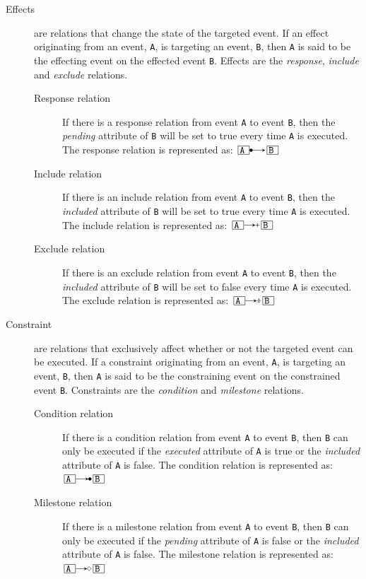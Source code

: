 \documentclass{article}
\begin{document}
			\begin{description}
				\item[Effects] are relations that change the state of the targeted event.
				If an effect originating from an event, \texttt{A}, is targeting an event, \texttt{B}, then \texttt{A} is said to be the effecting event on the effected event \texttt{B}.
				Effects are the \emph{response}, \emph{include} and \emph{exclude} relations.
				\begin{description}
					\item[Response relation] If there is a response relation from event \texttt{A} to event \texttt{B}, then the \textit{pending} attribute of \texttt{B} will be set to true every time \texttt{A} is executed.
				The response relation is represented as: $\ev{A} \rrel \ev{B}$
					\item[Include relation] If there is an include relation from event \texttt{A} to event \texttt{B}, then the \textit{included} attribute of \texttt{B} will be set to true every time \texttt{A} is executed.
				The include relation is represented as: $\ev{A} \irel \ev{B}$
					\item[Exclude relation] If there is an exclude relation from event \texttt{A} to event \texttt{B}, then the \textit{included} attribute of \texttt{B} will be set to false every time \texttt{A} is executed.
				The exclude relation is represented as: $\ev{A} \erel \ev{B}$
				\end{description}
				\item[Constraint] are relations that exclusively affect whether or not the targeted event can be executed.
				If a constraint originating from an event, \texttt{A}, is targeting an event, \texttt{B}, then \texttt{A} is said to be the constraining event on the constrained event \texttt{B}.
				Constraints are the \emph{condition} and \emph{milestone} relations.
				\begin{description}
					\item[Condition relation] If there is a condition relation from event \texttt{A} to event \texttt{B}, then \texttt{B} can only be executed if the \textit{executed} attribute of \texttt{A} is true or the \textit{included} attribute of \texttt{A} is false.
				The condition relation is represented as: $\ev{A} \crel \ev{B}$
					\item[Milestone relation] If there is a milestone relation from event \texttt{A} to event \texttt{B}, then \texttt{B} can only be executed if the \textit{pending} attribute of \texttt{A} is false or the \textit{included} attribute of \texttt{A} is false.
				The milestone relation is represented as: $\ev{A} \mrel \ev{B}$
				\end{description}
			\end{description}
\end{document}
